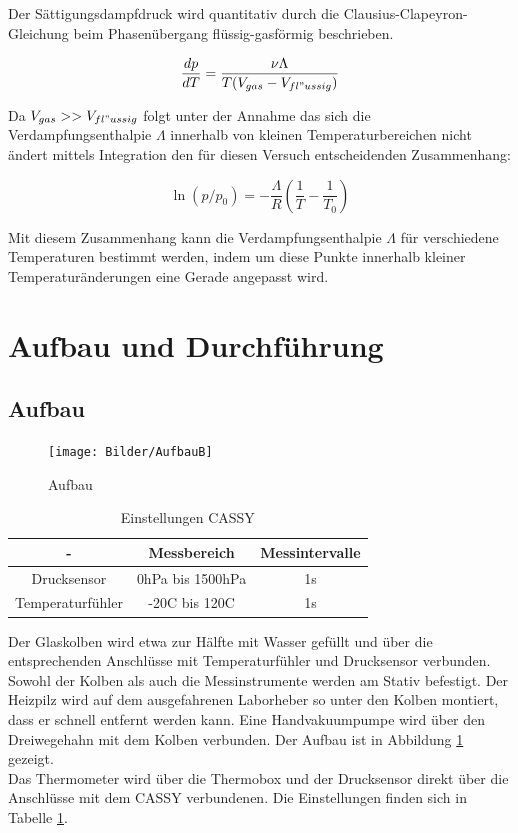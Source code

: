 \documentclass[12pt,a4paper]{article}
\begin{document}
Der Sättigungsdampfdruck wird quantitativ durch die Clausius-Clapeyron-Gleichung beim Phasenübergang flüssig-gasförmig beschrieben.

\begin{equation}
\frac{dp}{dT}=\frac{\nu \Lambda}{T(V_{gas}-			V_{fl"ussig})}
\end{equation}

Da $V_{gas} >> V_{fl"ussig}$ folgt unter der Annahme das sich die Verdampfungsenthalpie $\Lambda$ innerhalb von kleinen Temperaturbereichen nicht ändert mittels Integration den für diesen Versuch entscheidenden Zusammenhang:

\begin{equation}
\ln{(p/p_0)}=-\frac{\Lambda}{R} \left(\frac{1}{T}-			\frac{1}{T_0}\right)
\end{equation}

Mit diesem Zusammenhang kann die Verdampfungsenthalpie $\Lambda$ für verschiedene Temperaturen bestimmt werden, indem um diese Punkte innerhalb kleiner Temperaturänderungen eine Gerade angepasst wird.

\section{Aufbau und Durchführung}
\label{sec:Aufbau und Durchfühung}

\subsection{Aufbau}

\begin{figure}[H]
\texttt{[image: Bilder/AufbauB]}
\caption[AufbauB]{Aufbau}
\label{fig:AufbauB}
\end{figure}


\begin{table}
\begin{center}
\begin{tabular}{|c|c|c|}
\hline
- & Messbereich & Messintervalle\\
\hline
Drucksensor & 0hPa bis 1500hPa& 1s\\
\hline
Temperaturfühler & -20C bis 120C& 1s\\
\hline
\end{tabular}
\caption{Einstellungen CASSY}
\label{tab:CASSY}
\end{center}
\end{table}


Der Glaskolben wird etwa zur Hälfte mit Wasser gefüllt und über die entsprechenden Anschlüsse mit Temperaturfühler und Drucksensor verbunden. Sowohl der Kolben als auch die Messinstrumente werden am Stativ befestigt. Der Heizpilz wird auf dem ausgefahrenen Laborheber so unter den Kolben montiert, dass er schnell entfernt werden kann. Eine Handvakuumpumpe wird über den Dreiwegehahn mit dem Kolben verbunden. Der Aufbau ist in Abbildung \ref{fig:AufbauB} gezeigt.\\
Das Thermometer wird über die Thermobox und der Drucksensor direkt über die Anschlüsse mit dem CASSY verbundenen. Die Einstellungen finden sich in Tabelle \ref{tab:CASSY}. \\
\end{document}
